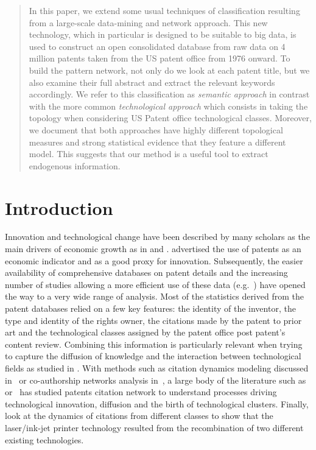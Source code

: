 \documentclass[10pt,A4,draft]{article}
\begin{document}
\newpage

\begin{abstract}
\justify
In this paper, we extend some usual techniques of classification resulting from a large-scale data-mining and network approach. This new technology, which in particular is designed to be suitable to big data, is used to construct an open consolidated database from raw data on 4 million patents taken from the US patent office from 1976 onward. To build the pattern network, not only do we look at each patent title, but we also examine their full abstract and extract the relevant keywords accordingly. We refer to this classification as \emph{semantic approach} in contrast with the more common \emph{technological approach} which consists in taking the topology when considering US Patent office technological classes. Moreover, we document that both approaches have highly different topological measures and strong statistical evidence that they feature a different model. This suggests that our method is a useful tool to extract endogenous information.    
\end{abstract}


\linenumbers


\justify


\section{Introduction}
Innovation and technological change have been described by many scholars as the main drivers of economic growth as in \cite{aghionhowitt1992} and \cite{romer1990}. \cite{RePEc:nbr:nberwo:3301} advertised the use of patents as an economic indicator and as a good proxy for innovation. Subsequently, the easier availability of comprehensive databases on patent details and the increasing number of studies allowing a more efficient use of these data (e.g.~\cite{Hall2001}) have opened the way to a very wide range of analysis. Most of the statistics derived from the patent databases relied on a few key features: the identity of the inventor, the type and identity of the rights owner, the citations made by the patent to prior art and the technological classes assigned by the patent office post patent's content review. Combining this information is particularly relevant when trying to capture the diffusion of knowledge and the interaction between technological fields as studied in \cite{Youn:2015fk}. With methods such as citation dynamics modeling discussed in~\cite{2013arXiv1310.8220N} or co-authorship networks analysis in~\cite{2014arXiv1402.7268S}, a large body of the literature such as~\cite{sorenson2006complexity} or~\cite{kay2014patent} has studied patents citation network to understand processes driving technological innovation, diffusion and the birth of technological clusters. Finally, \cite{bruck2016recognition} look at the dynamics of citations from different classes to show that the laser/ink-jet printer technology resulted from the recombination of two different existing technologies. 
\end{document}
